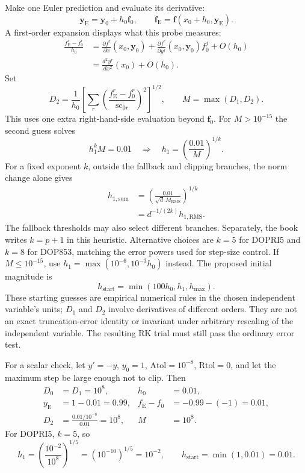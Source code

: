 Make one Euler prediction and evaluate its derivative:
\begin{equation}\label{Eq:AdaptEulerProbe}
 \mathbf y_{\mathrm E}=\mathbf y_0+h_0\mathbf f_0,
 \qquad
 \mathbf f_{\mathrm E}=\mathbf f(x_0+h_0,\mathbf y_{\mathrm E}).
\end{equation}
A first-order expansion displays what this probe measures:
\begin{align*}
 \frac{f_{\mathrm E}^r-f_0^r}{h_0}
 &=\frac{\partial f^r}{\partial x}(x_0,\mathbf y_0)
   +\frac{\partial f^r}{\partial y^j}(x_0,\mathbf y_0)f_0^j+O(h_0)\\
 &=\frac{d^2y^r}{dx^2}(x_0)+O(h_0).
\end{align*}
Set
\[
 D_2=\frac1{h_0}\left[\sum_r
       \left(\frac{f_{\mathrm E}^r-f_0^r}{\mathrm{sc}_{0r}}\right)^2
       \right]^{1/2},\qquad M=\max(D_1,D_2).
\]
This uses one extra right-hand-side evaluation beyond $\mathbf f_0$.
For $M>10^{-15}$ the second guess solves
\begin{equation}\label{Eq:AdaptSecondGuess}
 h_1^kM=0.01
 \quad\Longrightarrow\quad
 h_1=\left(\frac{0.01}{M}\right)^{1/k}.
\end{equation}
For a fixed exponent $k$, outside the fallback and clipping branches,
the norm change alone gives
\[
\begin{aligned}
 h_{1,\mathrm{sum}}
 &=\left(\frac{0.01}{\sqrt d\,M_{\mathrm{RMS}}}\right)^{1/k}\\
 &=d^{-1/(2k)}h_{1,\mathrm{RMS}}.
\end{aligned}
\]
The fallback thresholds may also select different branches. Separately,
the book writes $k=p+1$ in this heuristic. Alternative choices are $k=5$
for DOPRI5 and $k=8$ for DOP853, matching the error powers used for step-size
control. If $M\leq10^{-15}$, use
$h_1=\max(10^{-6},10^{-3}h_0)$ instead. The proposed initial magnitude is
\begin{equation}\label{Eq:AdaptInitialStep}
 h_{\mathrm{start}}=\min(100h_0,h_1,h_{\max}).
\end{equation}
These starting guesses are empirical numerical rules in the chosen independent
variable's units; $D_1$ and $D_2$ involve derivatives of different orders.
They are not an exact truncation-error identity or invariant under arbitrary
rescaling of the independent variable. The resulting RK trial must still pass
the ordinary error test.

For a scalar check, let $y'=-y$, $y_0=1$, $\mathrm{Atol}=10^{-8}$,
$\mathrm{Rtol}=0$, and let the maximum step be large enough not to clip.
Then
\[
\begin{aligned}
 D_0&=D_1=10^8, &h_0&=0.01,\\
 y_{\mathrm E}&=1-0.01=0.99,
 &f_{\mathrm E}-f_0&=-0.99-(-1)=0.01,\\
 D_2&=\frac{0.01/10^{-8}}{0.01}=10^8,
 &M&=10^8.
\end{aligned}
\]
For DOPRI5, $k=5$, so
\[
 h_1=\left(\frac{10^{-2}}{10^8}\right)^{1/5}
     =(10^{-10})^{1/5}=10^{-2},\qquad
 h_{\mathrm{start}}=\min(1,0.01)=0.01.
\]

